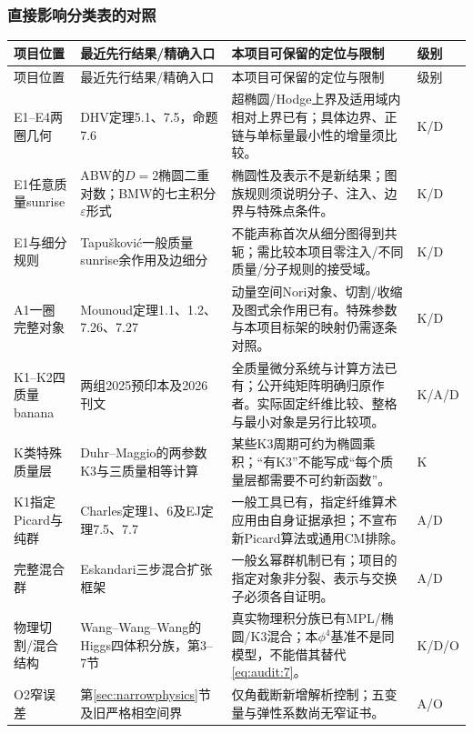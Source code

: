 \documentclass[11pt,a4paper]{ctexart}
\theoremstyle{cnplain}\newtheorem{theorem}{定理}[section]
\theoremstyle{definition}\newtheorem{definition}[theorem]{定义}
\theoremstyle{remark}\newtheorem{remark}[theorem]{注}
\begin{document}
\subsubsection{直接影响分类表的对照}
\small
\setlength{\tabcolsep}{5pt}
\begin{longtable}{p{}p{}p{}p{}}
\toprule
项目位置 & 最近先行结果/精确入口 & 本项目可保留的定位与限制 & 级别\\\midrule
\endfirsthead
\toprule 项目位置 & 最近先行结果/精确入口 & 本项目可保留的定位与限制 & 级别\\\midrule
\endhead
E1--E4两圈几何 &
DHV定理5.1、7.5，命题7.6\cite{DHV} &
超椭圆/Hodge上界及适用域内相对上界已有；具体边界、正链与单标量最小性的增量须比较。 & K/D\\
E1任意质量sunrise &
ABW的$D=2$椭圆二重对数；BMW的七主积分$\varepsilon$形式\cite{LitABW,LitBMW} &
椭圆性及表示不是新结果；图族规则须说明分子、注入、边界与特殊点条件。 & K/D\\
E1与细分规则 &
Tapušković一般质量sunrise余作用及边细分\cite{LitTap} &
不能声称首次从细分图得到共轭；需比较本项目零注入/不同质量/分子规则的接受域。 & K/D\\
A1一圈完整对象 &
Mounoud定理1.1、1.2、7.26、7.27\cite{LitMou} &
动量空间Nori对象、切割/收缩及图式余作用已有。特殊参数与本项目标架的映射仍需逐条对照。 & K/D\\
K1--K2四质量banana &
两组2025预印本及2026刊文\cite{LitDMPS,LitPTWW} &
全质量微分系统与计算方法已有；公开纯矩阵明确归原作者。实际固定纤维比较、整格与最小对象是另行比较项。 & K/A/D\\
K类特殊质量层 &
Duhr--Maggio的两参数K3与三质量相等计算\cite{LitDM,LitDMfull} &
某些K3周期可约为椭圆乘积；“有K3”不能写成“每个质量层都需要不可约新函数”。 & K\\
K1指定Picard与纯群 &
Charles定理1、6及EJ定理7.5、7.7\cite{LitCharles,LitEJ} &
一般工具已有，指定纤维算术应用由自身证据承担；不宣布新Picard算法或通用CM排除。 & A/D\\
完整混合群 &
Eskandari三步混合扩张框架\cite{LitEsk} &
一般幺幂群机制已有；项目的指定对象非分裂、表示与交换子必须各自证明。 & A/D\\
物理切割/混合结构 &
Wang--Wang--Wang的Higgs四体积分族，第3--7节\cite{LitWWW} &
真实物理积分族已有MPL/椭圆/K3混合；本$\phi^4$基准不是同模型，不能借其替代\eqref{eq:audit:7}。 & K/D/O\\
O2窄误差 &
第\ref{sec:narrowphysics}节及旧严格相空间界 &
仅角截断新增解析控制；五变量与弹性系数尚无窄证书。 & A/O\\
\bottomrule
\end{longtable}
\normalsize
\end{document}
